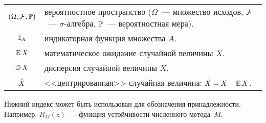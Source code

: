 \begin{center}
\begin{tabularx}{\textwidth}{cl}
        \rule{0pt}{16pt}%
        $ (\Omega, \mathcal{F}, \mathbb{P}) $ & \makecell[l]{вероятностное пространство ($ \Omega $~--- множество исходов, \\
                                                        $ \mathcal{F} $~--- $ \sigma $-алгебра, $ \mathbb{P} $~--- вероятностная мера).} \\
        $ \mathbb{I}_A $                 & индикаторная функция множества $ A $. \\
        $ \operatorname{\mathbb{E}} X $                    & математическое ожидание случайной величины $ X $. \\
        $ \operatorname{\mathbb{D}} X $                & дисперсия случайной величины $ X $. \\
        $ \mathring{X} $                  & <<центрированная>> случайная величина: $ \mathring{X} = X - \operatorname{\mathbb{E}} X $. \\
    \end{tabularx}
\end{center}

Нижний индекс может быть использован для обозначения принадлежности.
Например, $ R_M(z) $~--- функция устойчивости численного метода~$ M $.

